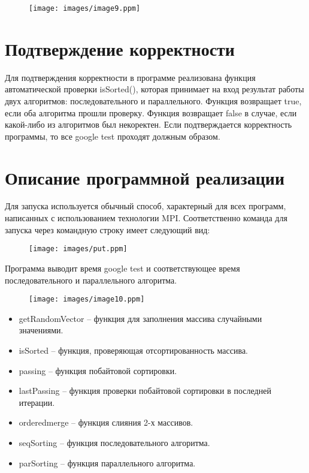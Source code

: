 \documentclass{report}
\begin{document}
\begin{figure}[htp]
    \centering
    \texttt{[image: images/image9.ppm]}
    \label{fig:galaxy}
\end{figure}

\newpage

\section*{Подтверждение корректности}

\par Для подтверждения корректности в программе реализована функция автоматической проверки isSorted(), которая принимает на вход результат работы двух алгоритмов: последовательного и параллельного. Функция возвращает true, если оба алгоритма прошли проверку. Функция возвращает false в случае, если какой-либо из алгоритмов был некоректен. Если подтверждается корректность программы, то все google test проходят должным образом.

\newpage
\section*{Описание программной реализации}

\par Для запуска используется обычный способ, характерный для всех программ, написанных с использованием технологии MPI. Соответственно команда для запуска через командную строку имеет следующий вид:

\begin{figure}[htp]
    \centering
    \texttt{[image: images/put.ppm]}
    \label{fig:galaxy}
\end{figure}

\par Программа выводит время google test и соответствующее время последовательного и параллельного алгоритма.

\begin{figure}[htp]
    \centering
    \texttt{[image: images/image10.ppm]}
    \label{fig:galaxy}
\end{figure}

\begin{itemize}

\item getRandomVector – функция для заполнения массива случайными значениями. 
\item isSorted – функция, проверяющая отсортированность массива.
\item passing – функция побайтовой сортировки.
\item lastPassing – функция проверки побайтовой сортировки в последней итерации.
\item orderedmerge – функция слияния 2-х массивов.
\item seqSorting – функция последовательного алгоритма.
\item parSorting – функция параллельного алгоритма.

\end{itemize}
\newpage
\end{document}
